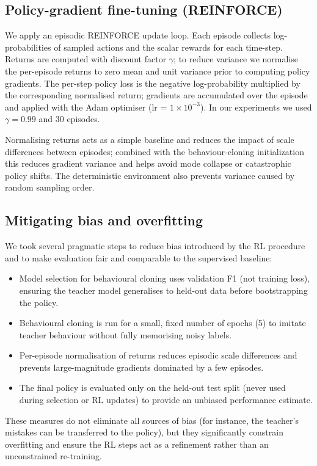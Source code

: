 \documentclass[conference]{IEEEtran}
\begin{document}
\subsection{Policy-gradient fine-tuning (REINFORCE)}
We apply an episodic REINFORCE update loop. Each episode collects log-probabilities of sampled actions and the scalar rewards for each time-step. Returns are computed with discount factor $\gamma$; to reduce variance we normalise the per-episode returns to zero mean and unit variance prior to computing policy gradients. The per-step policy loss is the negative log-probability multiplied by the corresponding normalised return; gradients are accumulated over the episode and applied with the Adam optimiser (lr = $1\times10^{-3}$). In our experiments we used $\gamma=0.99$ and 30 episodes.

Normalising returns acts as a simple baseline and reduces the impact of scale differences between episodes; combined with the behaviour-cloning initialization this reduces gradient variance and helps avoid mode collapse or catastrophic policy shifts. The deterministic environment also prevents variance caused by random sampling order.

\subsection{Mitigating bias and overfitting}
We took several pragmatic steps to reduce bias introduced by the RL procedure and to make evaluation fair and comparable to the supervised baseline:
\begin{itemize}
  \item Model selection for behavioural cloning uses validation F1 (not training loss), ensuring the teacher model generalises to held-out data before bootstrapping the policy.
  \item Behavioural cloning is run for a small, fixed number of epochs (5) to imitate teacher behaviour without fully memorising noisy labels.
  \item Per-episode normalisation of returns reduces episodic scale differences and prevents large-magnitude gradients dominated by a few episodes.
  \item The final policy is evaluated only on the held-out test split (never used during selection or RL updates) to provide an unbiased performance estimate.
\end{itemize}

These measures do not eliminate all sources of bias (for instance, the teacher's mistakes can be transferred to the policy), but they significantly constrain overfitting and ensure the RL steps act as a refinement rather than an unconstrained re-training.
\end{document}
